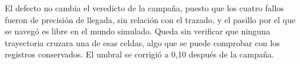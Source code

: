 El defecto no cambia el veredicto de la campaña, puesto que los cuatro fallos fueron de precisión de llegada, sin relación con el trazado, y el pasillo por el que se navegó es libre en el mundo simulado. Queda sin verificar que ninguna trayectoria cruzara una de esas celdas, algo que se puede comprobar con los registros conservados. El umbral se corrigió a 0,10 después de la campaña.
